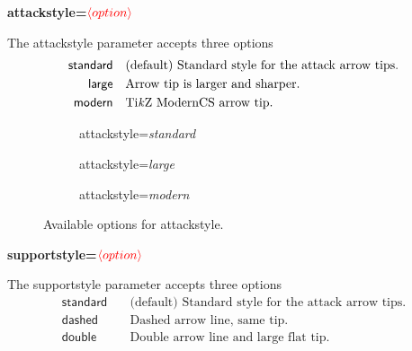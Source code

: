 \documentclass[headings=normal]{scrartcl}
\newcommand{\tikzname}{Ti\emph{k}Z\xspace}
\newcommand{\opt}[2][red]{\ensuremath{\textcolor{#1}{\langle #2\rangle}}}
\begin{document}
\newpage
{\bfseries\sffamily\noindent attackstyle=\opt{option}}
    
    The \textsf{attackstyle} parameter accepts three options
    \begin{align*}
        \mathsf{standard} &\quad \text{(default) Standard style for the attack arrow tips.}\\
        \mathsf{large} &\quad \text{Arrow tip is larger and sharper.}\\
        \mathsf{modern} &\quad \text{\tikzname ModernCS arrow tip.}
    \end{align*}

\begin{figure}[!h]
    \begin{subfigure}{0.32\textwidth}
        \centering
        \begin{af}[attackstyle=standard]
    
        \end{af}
        \caption{\textsf{attackstyle}=\textit{standard}}
        \label{fig:attackstyle_standard}
    \end{subfigure}
    \hfill
    \begin{subfigure}{0.3\textwidth}
        \centering
        \begin{af}[attackstyle=large]
    
        \end{af}
        \caption{\textsf{attackstyle}=\textit{large}}
        \label{fig:attackstyle_large}
    \end{subfigure}
    \hfill
    \begin{subfigure}{0.3\textwidth}
        \centering
        \begin{af}[attackstyle=modern]
    
        \end{af}
        \caption{\textsf{attackstyle}=\textit{modern}}
        \label{fig:attackstyle_thick}
    \end{subfigure}
    \caption{Available options for \textsf{attackstyle}.}
    \label{fig:attackstyle}
\end{figure}

{\bfseries\sffamily\noindent supportstyle=\opt{option}}
    
    The \textsf{supportstyle} parameter accepts three options
    \begin{align*}
        \mathsf{standard} &\quad \text{(default) Standard style for the attack arrow tips.}\\
        \mathsf{dashed} &\quad \text{Dashed arrow line, same tip.}\\
        \mathsf{double} &\quad \text{Double arrow line and large flat tip.}
    \end{align*}
\end{document}
